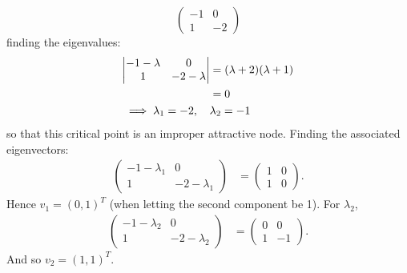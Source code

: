 \documentclass{article}
\begin{document}
\begin{itemize}
\begin{itemize}
\[\begin{pmatrix}
            -1 & 0\\
            1 & -2
        \end{pmatrix}\]
        finding the eigenvalues:
        \begin{align*}
            \left|\begin{matrix}
                -1 -\lambda & 0\\
                1 & -2 - \lambda
            \end{matrix}\right| &= (\lambda + 2)(\lambda + 1)\\
            &= 0\\
            \implies \lambda_1 = -2, \hspace{0.4cm} &\lambda_2 = -1
        \end{align*}
        so that this critical point is an improper attractive node. Finding the associated eigenvectors:
        \begin{align*}
            \begin{pmatrix}
                -1 - \lambda_1 & 0\\
                1 & -2 - \lambda_1
            \end{pmatrix} &= \begin{pmatrix}
                1 & 0\\
                1 & 0
            \end{pmatrix}.
        \end{align*}
        Hence $v_1 = (0,1)^T$ (when letting the second component be 1). For $\lambda_2$,
        \begin{align*}
            \begin{pmatrix}
                -1 - \lambda_2 & 0\\
                1 & -2 - \lambda_2
            \end{pmatrix} &= \begin{pmatrix}
                0 & 0\\
                1 & -1
            \end{pmatrix}.
        \end{align*}
        And so $v_2 = (1,1)^T$.





\end{itemize}
\end{itemize}
\end{document}
